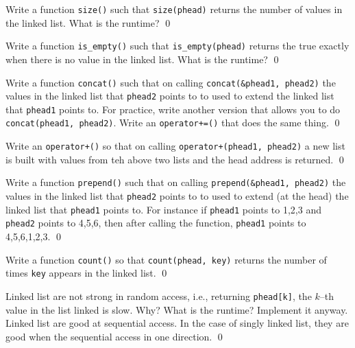 \begin{ex}
Write a function \verb!size()! such that
\verb!size(phead)! returns the number of values in the linked list.
What is the runtime?
\qed
\end{ex}


\begin{ex}
Write a function \verb!is_empty()! such that
\verb!is_empty(phead)! returns the true exactly when
there is no value in the linked list.
What is the runtime?
\qed
\end{ex}


\begin{ex}
Write a function \texttt{concat()} such that
on calling \texttt{concat(\&phead1, phead2)}
the values in the linked list that \texttt{phead2} points to
to used to extend the linked list that
\texttt{phead1} points to.
For practice, write another version that allows you to do
\texttt{concat(phead1, phead2)}.
Write an \texttt{operator+=()} that does the same thing.
\qed
\end{ex}

\begin{ex}
Write an \texttt{operator+()} so that on calling
\texttt{operator+(phead1, phead2)}
a new list is built with values from teh above two lists
and the head address is returned.
\qed
\end{ex}
  

\begin{ex}
Write a function \texttt{prepend()} such that
on calling \texttt{prepend(\&phead1, phead2)}
the values in the linked list that \texttt{phead2} points to
to used to extend (at the head) the linked list that
\verb!phead1! points to.
For instance if
\texttt{phead1} points to 1,2,3
and
\texttt{phead2} points to 4,5,6,
then after calling the function,
\texttt{phead1} points to 4,5,6,1,2,3.
\qed
\end{ex}


\begin{ex}
  Write a function \texttt{count()} so that
  \texttt{count(phead, key)} returns the number of times \texttt{key}
  appears in the linked list.
  \qed
\end{ex}


\begin{ex}
  Linked list are not strong in random access, i.e.,
  returning \texttt{phead[k]}, the $k$--th value in the list linked
  is slow.
  Why? What is the runtime?
  Implement it anyway.
  Linked list are good at sequential access. In the case of singly
  linked list, they are good when the sequential access in one direction.
  \qed
\end{ex}

